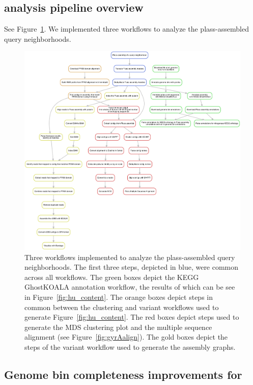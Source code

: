 \subsection{\hu analysis pipeline overview}


See Figure~\ref{fig:hu_dag}. We implemented three workflows to analyze the
plass-assembled \hu query neighborhoods. 


\begin{figure}
 \centering
 \includegraphics[width=\linewidth]{figures/hu_dag}
	\caption{Three workflows implemented to analyze the plass-assembled
\hu query neighborhoods. The first three steps, depicted in blue, were common
across all workflows. The green boxes depict the KEGG GhostKOALA annotation
workflow, the results of which can be see in Figure~\ref{fig:hu_content}. 
The orange boxes depict steps in common between the clustering and variant
workflows used to generate Figure~\ref{fig:hu_content}. The red boxes depict
steps used to generate the MDS clustering plot and the multiple sequence 
alignment (see Figure~\ref{fig:gyrAalign}). The gold boxes depict the
steps of the variant workflow used to generate the assembly graphs.  
}
 \label{fig:hu_dag}
\end{figure}

\subsection{Genome bin completeness improvements for \hu}
\label{subsec:checkm}

